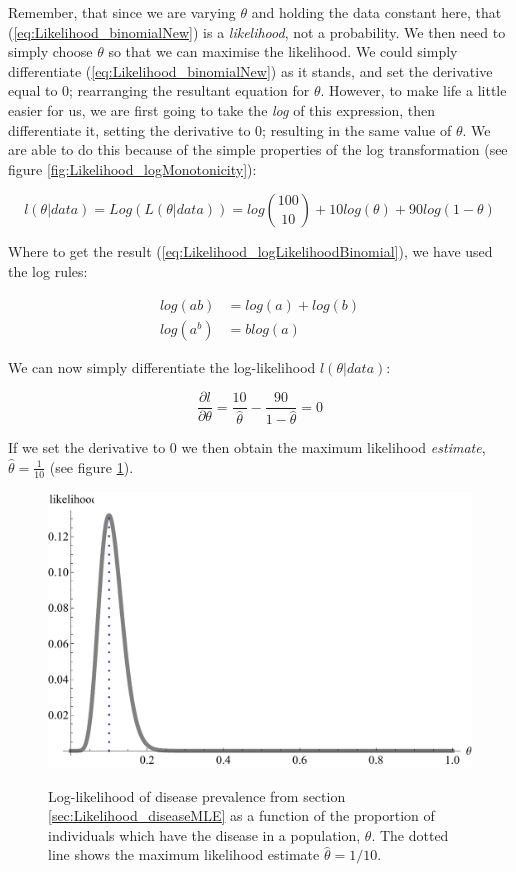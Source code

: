 \documentclass[11pt,fullpage]{book}
\begin{document}
Remember, that since we are varying $\theta$ and holding the data constant here, that (\ref{eq:Likelihood_binomialNew}) is a \textit{likelihood}, not a probability. We then need to simply choose $\theta$ so that we can maximise the likelihood. We could simply differentiate (\ref{eq:Likelihood_binomialNew}) as it stands, and set the derivative equal to 0; rearranging the resultant equation for $\theta$. However, to make life a little easier for us, we are first going to take the \textit{log} of this expression, then differentiate it, setting the derivative to 0; resulting in the same value of $\theta$. We are able to do this because of the simple properties of the log transformation (see figure \ref{fig:Likelihood_logMonotonicity}):

\begin{equation}\label{eq:Likelihood_logLikelihoodBinomial}
l(\theta|data) = Log \left(L(\theta|data)\right) = log{100 \choose 10}+ 10log(\theta)+ 90 log(1-\theta)
\end{equation}

Where to get the result (\ref{eq:Likelihood_logLikelihoodBinomial}), we have used the log rules:

\begin{align}\label{eq:Likelihood_logRules}
log(ab) &= log(a) + log(b)\\
log(a^b) &= blog(a)
\end{align}

We can now simply differentiate the log-likelihood $l(\theta|data)$:

\begin{equation}\label{eq:Likelihood_binomialderiv}
\frac{\partial l}{\partial \theta} = \frac{10}{\hat{\theta}}-\frac{90}{1-\hat{\theta}} = 0
\end{equation}

If we set the derivative to 0 we then obtain the maximum likelihood \textit{estimate}, $\hat{\theta} = \frac{1}{10}$ (see figure \ref{fig:Likelihood_MLE}).

\begin{figure}
\centering
\scalebox{0.75} 
{\includegraphics{Likelihood_ML.pdf}}
\caption{Log-likelihood of disease prevalence from section \ref{sec:Likelihood_diseaseMLE} as a function of the proportion of individuals which have the disease in a population, $\theta$. The dotted line shows the maximum likelihood estimate $\hat{\theta}=1/10$.}\label{fig:Likelihood_MLE}
\end{figure}
\end{document}
